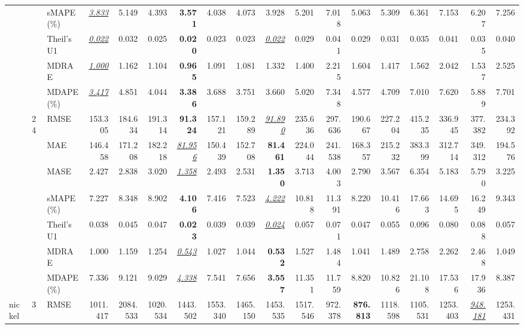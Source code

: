 \begin{table}[!htbp]
{\begin{tabular}{lllrrrrrrrrrrrrrrr}
 &  & sMAPE (\%) & \underline{\textit{3.833}} & 5.149 & 4.393 & \textbf{3.571} & 4.038 & 4.073 & 3.928 & 5.201 & 7.018 & 5.063 & 5.309 & 6.361 & 7.153 & 6.207 & 7.256 \\
 &  & Theil's U1 & \underline{\textit{0.022}} & 0.032 & 0.025 & \textbf{0.020} & 0.023 & 0.023 & \underline{\textit{0.022}} & 0.029 & 0.041 & 0.029 & 0.031 & 0.035 & 0.041 & 0.035 & 0.040 \\
 &  & MDRAE & \underline{\textit{1.000}} & 1.162 & 1.104 & \textbf{0.965} & 1.091 & 1.081 & 1.332 & 1.400 & 2.215 & 1.604 & 1.417 & 1.562 & 2.042 & 1.537 & 2.525 \\
 &  & MDAPE (\%) & \underline{\textit{3.417}} & 4.851 & 4.044 & \textbf{3.386} & 3.688 & 3.751 & 3.660 & 5.020 & 7.348 & 4.577 & 4.709 & 7.010 & 7.620 & 5.889 & 7.701 \\
\cmidrule(lr){2-18}
 & 24 & RMSE & 153.305 & 184.634 & 191.314 & \textbf{91.324} & 157.121 & 159.289 & \underline{\textit{91.890}} & 235.636 & 297.636 & 190.667 & 227.204 & 415.235 & 336.945 & 377.382 & 234.392 \\
 &  & MAE & 146.458 & 171.208 & 182.218 & \underline{\textit{81.956}} & 150.439 & 152.708 & \textbf{81.461} & 224.044 & 241.538 & 168.357 & 215.232 & 383.399 & 312.714 & 349.312 & 194.576 \\
 &  & MASE & 2.427 & 2.838 & 3.020 & \underline{\textit{1.358}} & 2.493 & 2.531 & \textbf{1.350} & 3.713 & 4.003 & 2.790 & 3.567 & 6.354 & 5.183 & 5.790 & 3.225 \\
 &  & sMAPE (\%) & 7.227 & 8.348 & 8.902 & \textbf{4.106} & 7.416 & 7.523 & \underline{\textit{4.222}} & 10.818 & 11.391 & 8.220 & 10.416 & 17.663 & 14.695 & 16.249 & 9.343 \\
 &  & Theil's U1 & 0.038 & 0.045 & 0.047 & \textbf{0.023} & 0.039 & 0.039 & \underline{\textit{0.024}} & 0.057 & 0.071 & 0.047 & 0.055 & 0.096 & 0.080 & 0.088 & 0.057 \\
 &  & MDRAE & 1.000 & 1.159 & 1.254 & \underline{\textit{0.543}} & 1.027 & 1.044 & \textbf{0.532} & 1.527 & 1.484 & 1.041 & 1.489 & 2.758 & 2.262 & 2.468 & 1.049 \\
 &  & MDAPE (\%) & 7.336 & 9.121 & 9.029 & \underline{\textit{4.338}} & 7.541 & 7.656 & \textbf{3.557} & 11.351 & 11.759 & 8.820 & 10.826 & 21.108 & 17.536 & 17.936 & 8.387 \\
\midrule
nickel & 3 & RMSE & 1011.417 & 2084.533 & 1020.534 & 1443.502 & 1553.340 & 1465.150 & 1453.535 & 1517.546 & 972.378 & \textbf{876.813} & 1118.598 & 1105.531 & 1253.403 & \underline{\textit{948.181}} & 1253.431 \\

\end{tabular}}
\end{table}
